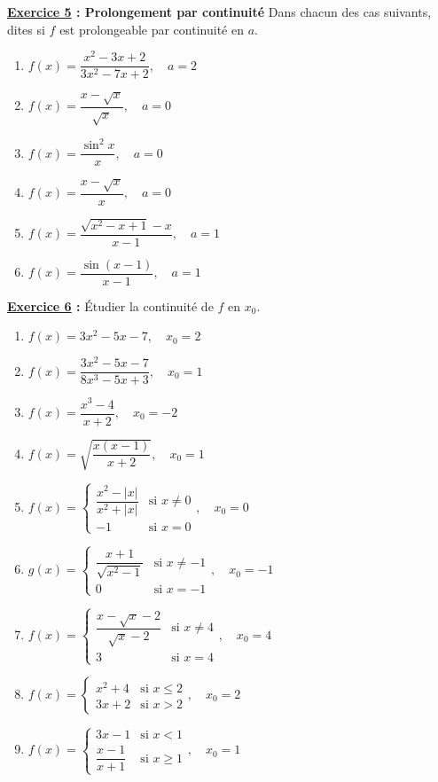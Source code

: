 \documentclass[12pt,a4paper]{article}
\begin{document}
\begin{multicols}{2}
\textbf{\underline{Exercice 5} : Prolongement par continuité}
Dans chacun des cas suivants, dites si \( f \) est prolongeable par continuité en \( a \).
\begin{enumerate}
  \item \( f(x) = \dfrac{x^2 - 3x + 2}{3x^2 - 7x + 2}, \quad a = 2 \)
  \item \( f(x) = \dfrac{x - \sqrt{x}}{\sqrt{x}}, \quad a = 0 \)
  \item \( f(x) = \dfrac{\sin^2 x}{x}, \quad a = 0 \)
  \item \( f(x) = \dfrac{x - \sqrt{x}}{x}, \quad a = 0 \)
  \item \( f(x) = \dfrac{\sqrt{x^2 - x + 1} - x}{x - 1}, \quad a = 1 \)
  \item \( f(x) = \dfrac{\sin(x - 1)}{x - 1}, \quad a = 1 \)
\end{enumerate}
\textbf{\underline{Exercice 6} :} Étudier la continuité de \( f \) en \( x_0 \).
\begin{enumerate}[leftmargin=*]
  \item \( f(x) = 3x^2 - 5x - 7, \quad x_0 = 2 \)
  \item \( f(x) = \dfrac{3x^2 - 5x - 7}{8x^3 - 5x + 3}, \quad x_0 = 1 \)
  \item \( f(x) = \dfrac{x^3 - 4}{x + 2}, \quad x_0 = -2 \)
  \item \( f(x) = \sqrt{\dfrac{x(x-1)}{x+2}}, \quad x_0 = 1 \)
  \item \(
    f(x) =
    \begin{cases}
      \dfrac{x^2 - |x|}{x^2 + |x|} & \text{si } x \neq 0 \\
      -1 & \text{si } x = 0
    \end{cases},
    \quad x_0 = 0
    \)
  \item \(
    g(x) =
    \begin{cases}
      \dfrac{x+1}{\sqrt{x^2 - 1}} & \text{si } x \neq -1 \\
      0 & \text{si } x = -1
    \end{cases},
    \quad x_0 = -1
    \)
  \item \(
    f(x) =
    \begin{cases}
      \dfrac{x - \sqrt{x} - 2}{\sqrt{x } - 2} & \text{si } x \neq 4 \\
      3 & \text{si } x = 4
    \end{cases},
    \quad x_0 = 4
    \)
  \item \(
    f(x) =
    \begin{cases}
      x^2 + 4 & \text{si } x \leq 2 \\
      3x + 2 & \text{si } x > 2
    \end{cases},
    \quad x_0 = 2
    \)
  \item \(
    f(x) =
    \begin{cases}
      3x - 1 & \text{si } x < 1 \\
      \dfrac{x - 1}{x + 1} & \text{si } x \geq 1
    \end{cases},
    \quad x_0 = 1
    \)
\end{enumerate}
\end{multicols}
\end{document}
